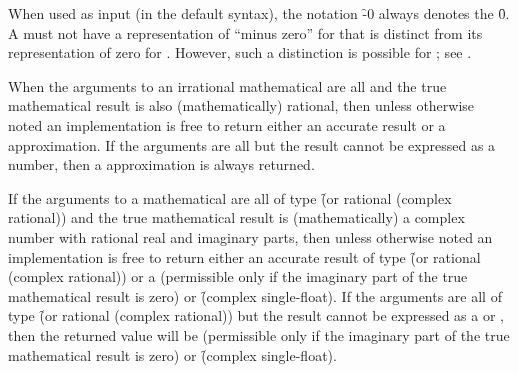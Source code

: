 When used as input (in the default syntax),
the notation \f{-0} always denotes the  \f{0}.
A  must not have a
representation of ``minus zero'' for 
that is distinct from its representation of zero for .
However, such a distinction is possible for ; 
see .

\endsubsubsection%


When the arguments to an irrational mathematical  
are all  and the true mathematical result
is also (mathematically) rational, then unless otherwise noted
an implementation is free to return either an accurate
 result
or a  approximation.
If the arguments are all  
but the result cannot be expressed
as a  number, then a  
approximation is always returned.

If the arguments to a mathematical  are all of type
  \f{(or rational (complex rational))} 
and the true mathematical result is
  (mathematically) a complex number with rational real and imaginary
  parts, then unless otherwise noted an implementation is free to return
  either an accurate result of type \f{(or rational (complex rational))} 
or
  a 
  (permissible only if the imaginary part of the true mathematical
  result is zero) or \f{(complex single-float)}. If the arguments are
  all of type \f{(or rational (complex rational))}
but the result cannot be
  expressed as a  or ,
then the returned
  value will be  
(permissible only if the imaginary
  part of the true mathematical result is zero) or \f{(complex single-float)}.
 
